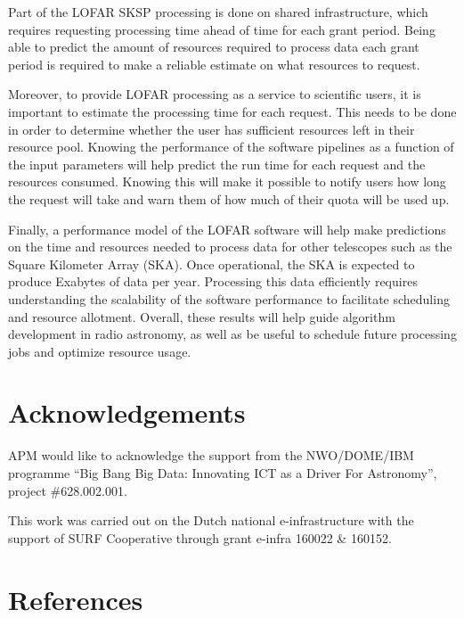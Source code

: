 \documentclass[preprint,5p]{elsarticle}
\begin{document}
Part of the LOFAR SKSP processing is done on shared infrastructure, which requires requesting processing time ahead of time for each grant period. Being able to predict the amount of resources required to process data each grant period is required to make a reliable estimate on what resources to request.

Moreover, to provide LOFAR processing as a service to scientific users, it is important to estimate the processing time for each request. This needs to be done in order to determine whether the user has sufficient resources left in their resource pool. Knowing the performance of the software pipelines as a function of the input parameters will help predict the run time for each request and the resources consumed. Knowing this will make it possible to notify users how long the request will take and warn them of how much of their quota will be used up. 

Finally, a performance model of the LOFAR software will help make predictions on the time and resources needed to process data for other telescopes such as the Square Kilometer Array (SKA). Once operational, the SKA is expected to produce Exabytes of data per year. Processing this data efficiently requires understanding the scalability of the software performance to facilitate scheduling and resource allotment. Overall, these results will help guide algorithm development in radio astronomy, as well as be useful to schedule future processing jobs and optimize resource usage. 




\section*{Acknowledgements}
APM would like to acknowledge the support from the NWO/DOME/IBM programme ``Big Bang Big Data: Innovating ICT as a Driver For Astronomy'', project \#628.002.001.



This work was carried out on the Dutch national e-infrastructure with the support of SURF
Cooperative through grant e-infra 160022 \& 160152.

\section*{References}

\end{document}
